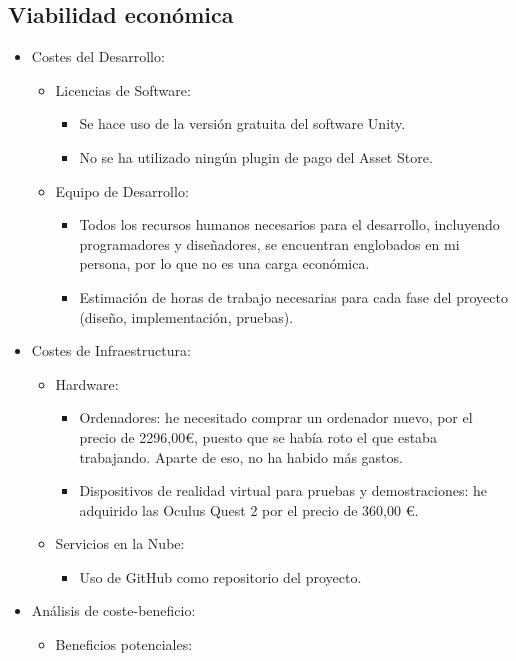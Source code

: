 \subsection{Viabilidad económica}

\begin{itemize}
	\item Costes del Desarrollo:
	\begin{itemize}
		\item Licencias de Software:
		\begin{itemize}
			\item Se hace uso de la versión gratuita del software Unity.
			\item No se ha utilizado ningún plugin de pago del Asset Store.
		\end{itemize}
		\item Equipo de Desarrollo:
		\begin{itemize}
			\item Todos los recursos humanos necesarios para el desarrollo, incluyendo programadores y diseñadores, se encuentran englobados en mi persona, por lo que no es una carga económica.
			\item Estimación de horas de trabajo necesarias para cada fase del proyecto (diseño, implementación, pruebas).
		\end{itemize}
	\end{itemize}
	\item Costes de Infraestructura:
	\begin{itemize}
		\item Hardware:
		\begin{itemize}
			\item Ordenadores: he necesitado comprar un ordenador nuevo, por el precio de 2296,00€, puesto que se había roto el que estaba trabajando. Aparte de eso, no ha habido más gastos.
			\item Dispositivos de realidad virtual para pruebas y demostraciones: he adquirido las Oculus Quest 2 por el precio de 360,00 €.
		\end{itemize}
		\item Servicios en la Nube:
		\begin{itemize}
			\item Uso de GitHub como repositorio del proyecto.
		\end{itemize}
	\end{itemize}
	\item Análisis de coste-beneficio:
	\begin{itemize}
		\item Beneficios potenciales:

\end{itemize}
\end{itemize}
